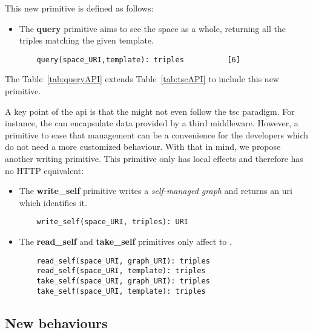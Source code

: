 This new primitive is defined as follows:
\begin{itemize}
  \item The \textbf{query} primitive aims to see the space as a whole, returning all the triples matching the given template.
  
  \begin{lstlisting}
    query(space_URI,template): triples          [6]
  \end{lstlisting}
\end{itemize}


The Table~\ref{tab:queryAPI} extends Table~\ref{tab:tscAPI} to include this new primitive.





A key point of the \ac{api} is that the \asteroids{} might not even follow the \ac{tsc} paradigm.
For instance, the \osapi{} can encapsulate data provided by a third middleware.
However, a primitive to ease that management can be a convenience for the developers which do not need a more customized behaviour.
With that in mind, we propose another writing primitive.
This primitive only has local effects and therefore has no HTTP equivalent:
\begin{itemize}
  \item The \textbf{write\_self} primitive writes a \emph{self-managed graph} and returns an \ac{uri} which identifies it.
  
  \begin{lstlisting}
    write_self(space_URI, triples): URI
  \end{lstlisting}
  
  \item The \textbf{read\_self} and \textbf{take\_self} primitives only affect to \selfgraphs{}.
  
  \begin{lstlisting}
    read_self(space_URI, graph_URI): triples
    read_self(space_URI, template): triples
    take_self(space_URI, graph_URI): triples
    take_self(space_URI, template): triples
  \end{lstlisting}
  
\end{itemize}



\subsection{New behaviours}

